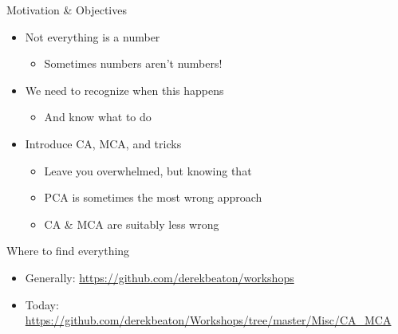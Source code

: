 \documentclass[
  ignorenonframetext,
]{beamer}
\providecommand{\tightlist}{%
  \setlength{\itemsep}{0pt}\setlength{\parskip}{0pt}}
\begin{document}
\begin{frame}{Motivation \& Objectives}
\protect\hypertarget{motivation-objectives}{}

\begin{itemize}[<+->]
\tightlist
\item
  Not everything is a number

  \begin{itemize}[<+->]
  \tightlist
  \item
    Sometimes numbers aren't numbers!
  \end{itemize}
\item
  We need to recognize when this happens

  \begin{itemize}[<+->]
  \tightlist
  \item
    And know what to do
  \end{itemize}
\item
  Introduce CA, MCA, and tricks

  \begin{itemize}[<+->]
  \tightlist
  \item
    Leave you overwhelmed, but knowing that
  \item
    PCA is sometimes the most wrong approach
  \item
    CA \& MCA are suitably less wrong
  \end{itemize}
\end{itemize}

\end{frame}

\begin{frame}{Where to find everything}
\protect\hypertarget{where-to-find-everything}{}

\begin{itemize}[<+->]
\tightlist
\item
  Generally: \url{https://github.com/derekbeaton/workshops}
\item
  Today:
  \url{https://github.com/derekbeaton/Workshops/tree/master/Misc/CA_MCA}
\end{itemize}

\end{frame}
\end{document}
